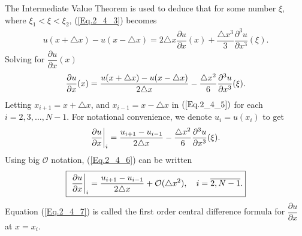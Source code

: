 The Intermediate Value Theorem is used to deduce that for some number $\xi$, where $\xi_{1} < \xi < \xi_{2}$, (\ref{Eq.2_4_3}) becomes
\begin{align} %
u(x + \triangle x ) - u(x - \triangle x ) =  2 \triangle x \dfrac{\partial u}{\partial x }(x) +  \dfrac{\triangle x^{3}}{3}  \dfrac{\partial^{3} u}{\partial x^{3} }(\xi).
\end{align}
Solving for $\dfrac{\partial u}{\partial x }(x) $
\begin{align} {\label{Eq.2_4_5}}
\dfrac{\partial u}{\partial x }(x) = \dfrac{u(x + \triangle x ) - u(x - \triangle x )}{2 \triangle x } -  \dfrac{\triangle x^{2}}{6} \dfrac{\partial^{3} u}{\partial x^{3} }(\xi).
\end{align}
Letting $x_{i+1} = x+ \triangle x$, and $x_{i-1} = x- \triangle x$ in $(\ref{Eq.2_4_5})$ for each $i = 2,3,\dots,N-1$. For notational convenience, we denote $u_{i}= u(x_{i})$ to get
\begin{align}{\label{Eq.2_4_6}}
\dfrac{\partial u}{\partial x }\bigg|_{i}= \dfrac{ u_{i+1}  - u_{i-1}}{2 \triangle x}  -  \dfrac{\triangle x^{2}}{6} \dfrac{\partial^{3} u}{\partial x^{3} }(\xi).
\end{align}
Using big $\mathcal{O}$ notation, (\ref{Eq.2_4_6}) can be written
\begin{align}{\label{Eq.2_4_7}}
\fbox{ $ \displaystyle \dfrac{\partial u}{\partial x }\bigg|_{i} = \dfrac{u_{i+1} - u_{i-1} }{2\triangle x} + \mathcal{O}(\triangle x^{2}),\quad i =\overline{2,N-1}.$}
\end{align}
Equation (\ref{Eq.2_4_7}) is called the first order central difference formula for $\dfrac{\partial u}{\partial x }$ at $x = x_{i}$.
